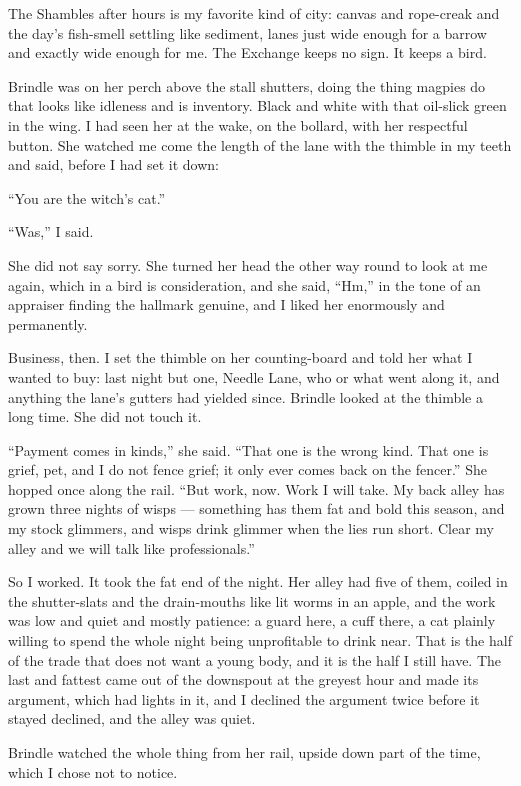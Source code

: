 The Shambles after hours is my favorite kind of city: canvas and rope-creak and the day's fish-smell settling like sediment, lanes just wide enough for a barrow and exactly wide enough for me. The Exchange keeps no sign. It keeps a bird.

Brindle was on her perch above the stall shutters, doing the thing magpies do that looks like idleness and is inventory. Black and white with that oil-slick green in the wing. I had seen her at the wake, on the bollard, with her respectful button. She watched me come the length of the lane with the thimble in my teeth and said, before I had set it down:

``You are the witch's cat.''

``Was,'' I said.

She did not say sorry. She turned her head the other way round to look at me again, which in a bird is consideration, and she said, ``Hm,'' in the tone of an appraiser finding the hallmark genuine, and I liked her enormously and permanently.

Business, then. I set the thimble on her counting-board and told her what I wanted to buy: last night but one, Needle Lane, who or what went along it, and anything the lane's gutters had yielded since. Brindle looked at the thimble a long time. She did not touch it.

``Payment comes in kinds,'' she said. ``That one is the wrong kind. That one is grief, pet, and I do not fence grief; it only ever comes back on the fencer.'' She hopped once along the rail. ``But work, now. Work I will take. My back alley has grown three nights of wisps --- something has them fat and bold this season, and my stock glimmers, and wisps drink glimmer when the lies run short. Clear my alley and we will talk like professionals.''

So I worked. It took the fat end of the night. Her alley had five of them, coiled in the shutter-slats and the drain-mouths like lit worms in an apple, and the work was low and quiet and mostly patience: a guard here, a cuff there, a cat plainly willing to spend the whole night being unprofitable to drink near. That is the half of the trade that does not want a young body, and it is the half I still have. The last and fattest came out of the downspout at the greyest hour and made its argument, which had lights in it, and I declined the argument twice before it stayed declined, and the alley was quiet.

Brindle watched the whole thing from her rail, upside down part of the time, which I chose not to notice.

